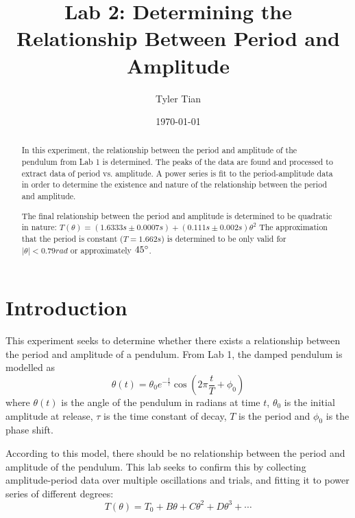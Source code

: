 \documentclass[aps,twocolumn,secnumarabic,nobalancelastpage,amsmath,amssymb,nofootinbib,floatfix]{revtex4}
\begin{document}
\title{Lab 2: Determining the Relationship Between Period and Amplitude}
\author{Tyler Tian}
\date{\today}


\begin{abstract}
In this experiment, the relationship between the period and amplitude of the pendulum from Lab 1 is determined. The
peaks of the data are found and processed to extract data of period vs. amplitude. A power series is fit to the 
period-amplitude data in order to determine the existence and nature of the relationship between the period and
amplitude.

The final relationship between the period and amplitude is determined to be quadratic in nature:
$T(\theta) = (1.6333\si{s} \pm 0.0007\si{s}) + (0.111\si{s} \pm 0.002\si{s})\theta^2$ The approximation that the period
is constant ($T = 1.662\si{s}$) is determined to be only valid for $|\theta| < 0.79\si{rad}$ or approximately
$45\degree$.
\end{abstract}

\maketitle


\section{Introduction}

This experiment seeks to determine whether there exists a relationship between the period and amplitude of a pendulum.
From Lab 1, the damped pendulum is modelled as
\begin{equation}
    \theta(t) = \theta_0 e^{-\frac{t}{\tau}}\cos\left(2\pi\frac{t}{T} + \phi_0\right)
    \label{eqn:model}
\end{equation}
where $\theta(t)$ is the angle of the pendulum in radians at time $t$, $\theta_0$ is the initial amplitude at release,
$\tau$ is the time constant of decay, $T$ is the period and $\phi_0$ is the phase shift.

According to this model, there should be no relationship between the period and amplitude of the pendulum. This lab
seeks to confirm this by collecting amplitude-period data over multiple oscillations and trials, and fitting it to power
series of different degrees:
\begin{equation}
    T(\theta) = T_0 + B\theta + C\theta^2 + D\theta^3 + \cdots
    \label{eqn:power_series}
\end{equation}
\end{document}
